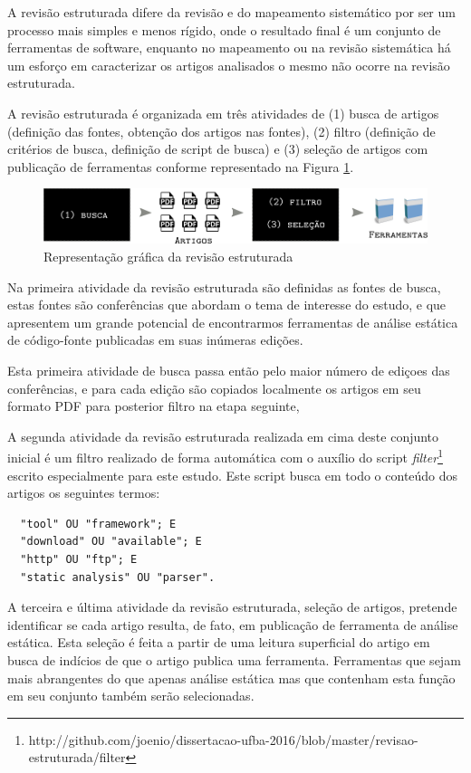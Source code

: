 A revisão estruturada difere da revisão e do mapeamento sistemático
por ser um processo mais simples e menos rígido, onde o resultado final é
um conjunto de ferramentas de software, enquanto no mapeamento ou na revisão
sistemática há um esforço em caracterizar os artigos analisados o mesmo
não ocorre na revisão estruturada.

A revisão estruturada é organizada em três atividades de (1) busca de artigos
(definição das fontes, obtenção dos artigos nas fontes), (2) filtro (definição
de critérios de busca, definição de script de busca) e (3) seleção de artigos
com publicação de ferramentas conforme representado na Figura
\ref{figura-revisao-estruturada}.

\begin{figure}[h]
  \center
  \includegraphics[scale=0.33]{imagens/revisao-estruturada.png}
  \caption{Representação gráfica da revisão estruturada}
  \label{figura-revisao-estruturada}
\end{figure}

Na primeira atividade da revisão estruturada são definidas as fontes de busca,
estas fontes são conferências que abordam o tema de interesse do estudo, e que
apresentem um grande potencial de encontrarmos ferramentas de análise estática
de código-fonte publicadas em suas inúmeras edições.

Esta primeira atividade de busca passa então pelo maior número de ediçoes das
conferências, e para cada edição são copiados localmente os
artigos em seu formato PDF para posterior filtro na etapa seguinte,

A segunda atividade da revisão estruturada realizada em cima deste conjunto inicial
é um filtro realizado de forma automática com o auxílio do script
{\it
filter}\footnote{http://github.com/joenio/dissertacao-ufba-2016/blob/master/revisao-estruturada/filter}
escrito especialmente para este estudo. Este script busca em todo o conteúdo
dos artigos os seguintes termos:

\begin{verbatim}
  "tool" OU "framework"; E
  "download" OU "available"; E
  "http" OU "ftp"; E
  "static analysis" OU "parser".
\end{verbatim}

A terceira e última atividade da revisão estruturada,
seleção de artigos, pretende identificar se cada artigo
resulta, de fato, em publicação de ferramenta de análise estática. Esta seleção
é feita a partir de uma leitura superficial do artigo em busca de indícios de
que o artigo publica uma ferramenta. Ferramentas que sejam mais abrangentes do
que apenas análise estática mas que contenham esta função em seu conjunto
também serão selecionadas.

